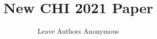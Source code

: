 \documentclass[sigconf,anonymous,review,manuscript]{acmart}
\begin{document}
\title[New CHI 2021 Paper]{New CHI 2021 Paper}

\author{Leave Authors Anonymous}












\maketitle
\end{document}
